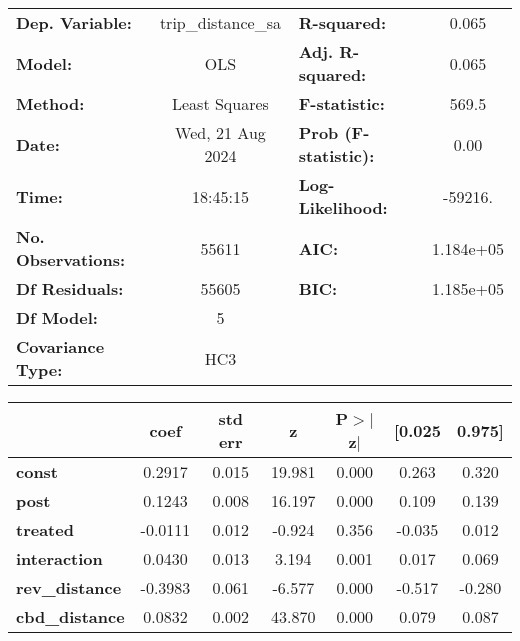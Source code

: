\begin{center}
\begin{tabular}{lclc}
\toprule
\textbf{Dep. Variable:}    & trip\_distance\_sa & \textbf{  R-squared:         } &     0.065   \\
\textbf{Model:}            &        OLS         & \textbf{  Adj. R-squared:    } &     0.065   \\
\textbf{Method:}           &   Least Squares    & \textbf{  F-statistic:       } &     569.5   \\
\textbf{Date:}             &  Wed, 21 Aug 2024  & \textbf{  Prob (F-statistic):} &     0.00    \\
\textbf{Time:}             &      18:45:15      & \textbf{  Log-Likelihood:    } &   -59216.   \\
\textbf{No. Observations:} &        55611       & \textbf{  AIC:               } & 1.184e+05   \\
\textbf{Df Residuals:}     &        55605       & \textbf{  BIC:               } & 1.185e+05   \\
\textbf{Df Model:}         &            5       & \textbf{                     } &             \\
\textbf{Covariance Type:}  &        HC3         & \textbf{                     } &             \\
\bottomrule
\end{tabular}
\begin{tabular}{lcccccc}
                       & \textbf{coef} & \textbf{std err} & \textbf{z} & \textbf{P$> |$z$|$} & \textbf{[0.025} & \textbf{0.975]}  \\
\midrule
\textbf{const}         &       0.2917  &        0.015     &    19.981  &         0.000        &        0.263    &        0.320     \\
\textbf{post}          &       0.1243  &        0.008     &    16.197  &         0.000        &        0.109    &        0.139     \\
\textbf{treated}       &      -0.0111  &        0.012     &    -0.924  &         0.356        &       -0.035    &        0.012     \\
\textbf{interaction}   &       0.0430  &        0.013     &     3.194  &         0.001        &        0.017    &        0.069     \\
\textbf{rev\_distance} &      -0.3983  &        0.061     &    -6.577  &         0.000        &       -0.517    &       -0.280     \\
\textbf{cbd\_distance} &       0.0832  &        0.002     &    43.870  &         0.000        &        0.079    &        0.087     \\

\end{tabular}
\end{center}
